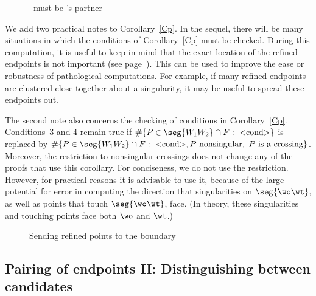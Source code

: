 \begin{figure}[htbp]\vspace{2.25in}\caption{\wt\ must be \wo's partner}\label{3.12}\end{figure}

We add two practical notes to Corollary~\ref{Cp}.
In the sequel,
there will be many situations in which the conditions of Corollary~\ref{Cp}
must be checked.
During this computation, it is useful to keep in mind that the exact location of the
refined endpoints is not important (see page~\pageref{page-flex}).
This can be used to improve the ease or robustness of pathological computations.
For example, if many refined endpoints are clustered close together about a singularity,
it may be useful to spread these endpoints out.

The second note also concerns the checking of conditions in Corollary~\ref{Cp}.
Conditions~3 and 4 remain true 
if $\#\{P \in \seg{W_{1}W_{2}} \cap F:\ \mbox{$<$cond$>$} \}$ 
is replaced by $\#\{P \in \seg{W_{1}W_{2}} \cap F:\ \mbox{$<$cond$>$},
P \mbox{ nonsingular},\\ \ P \mbox{ is a crossing}\}$.  
Moreover, the restriction to nonsingular crossings does not change any of the 
proofs that
use this corollary.
For conciseness, we do not use the restriction.
However, for practical reasons it is advisable to use it,
because of the large potential for error in computing the direction that
singularities on $\seg{\wo\wt}$, as well as points that touch $\seg{\wo\wt}$, face.
(In theory, these singularities and touching points face both $\wo$ and $\wt$.)

\begin{figure}[htbp]\vspace{3.5in}\caption{Sending refined points to the boundary}\label{3.J}\end{figure}

\subsection{Pairing of endpoints II: Distinguishing between candidates}
\label{sspII}

